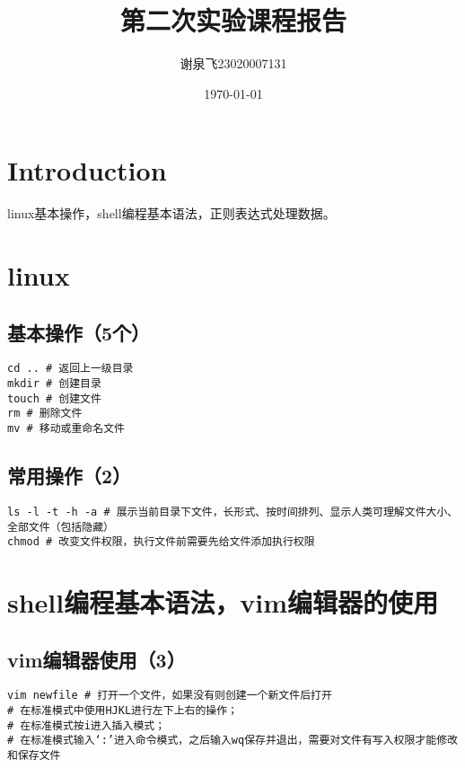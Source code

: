 \documentclass{article}
\begin{document}
	
	\title{第二次实验课程报告}
	\author{谢泉飞23020007131}
	\date{\today} %
	\maketitle
	
	\tableofcontents
	\newpage
	
	
	\section{Introduction}
	linux基本操作，shell编程基本语法，正则表达式处理数据。
	\section{linux}
		\subsection{基本操作（5个）}
			\begin{lstlisting}[]
cd .. # 返回上一级目录
mkdir # 创建目录
touch # 创建文件
rm # 删除文件
mv # 移动或重命名文件
			\end{lstlisting}
			
		\subsection{常用操作（2）}
			\begin{lstlisting}[]
ls -l -t -h -a # 展示当前目录下文件，长形式、按时间排列、显示人类可理解文件大小、全部文件（包括隐藏）
chmod # 改变文件权限，执行文件前需要先给文件添加执行权限
			\end{lstlisting}
					
	\section{shell编程基本语法，vim编辑器的使用}
		\subsection{vim编辑器使用（3）}
			\begin{lstlisting}[]
vim newfile # 打开一个文件，如果没有则创建一个新文件后打开
# 在标准模式中使用HJKL进行左下上右的操作；
# 在标准模式按i进入插入模式；
# 在标准模式输入‘:’进入命令模式，之后输入wq保存并退出，需要对文件有写入权限才能修改和保存文件
			\end{lstlisting}
\end{document}
